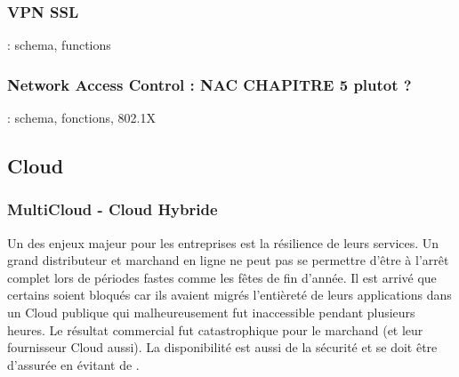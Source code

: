 \subsubsection{VPN SSL}
: schema, functions 
\utodo

\subsubsection{Network Access Control : NAC CHAPITRE 5 plutot ?}
: schema, fonctions, 802.1X 




\subsection{Cloud}

\subsubsection{MultiCloud - Cloud Hybride}

Un des enjeux majeur pour les entreprises est la résilience de leurs services. Un grand distributeur et marchand en ligne ne peut pas se permettre d'être à l'arrêt complet lors de périodes fastes comme les fêtes de fin d'année. Il est arrivé que certains soient bloqués car ils avaient migrés l'entièreté de leurs applications dans un Cloud publique qui malheureusement fut inaccessible pendant plusieurs heures. Le résultat commercial fut catastrophique pour le marchand (et leur fournisseur Cloud aussi). 
La disponibilité est aussi de la sécurité et se doit être d'assurée en évitant de .
